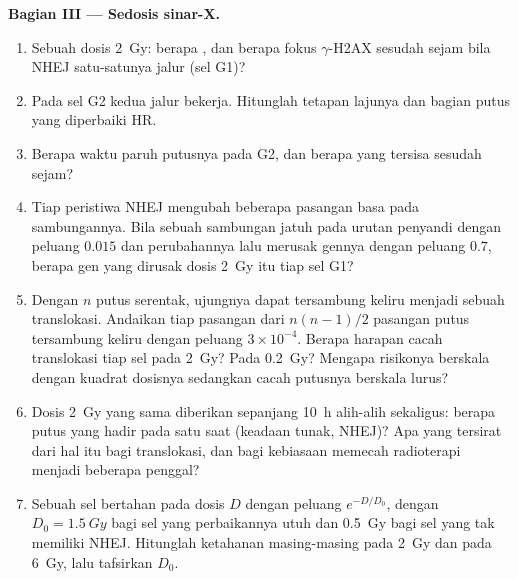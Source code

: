 \begin{problem}
\medskip
\noindent\textbf{Bagian III --- Sedosis sinar-X.}
\begin{enumerate}[resume]
  \item Sebuah dosis \qty{2}{Gy}: berapa , dan berapa
        fokus $\gamma$-H2AX sesudah sejam bila NHEJ satu-satunya jalur
        (sel G1)?
  \item Pada sel G2 kedua jalur bekerja. Hitunglah tetapan lajunya
        dan bagian putus yang diperbaiki HR.
  \item Berapa waktu paruh putusnya pada G2, dan berapa yang tersisa
        sesudah sejam?
  \item Tiap peristiwa NHEJ mengubah beberapa pasangan basa pada
        sambungannya. Bila sebuah sambungan jatuh pada urutan penyandi
        dengan peluang $0.015$ dan perubahannya lalu merusak gennya dengan
        peluang $0.7$, berapa gen yang dirusak dosis \qty{2}{Gy} itu tiap
        sel G1?
  \item Dengan $n$ putus serentak, ujungnya dapat tersambung keliru
        menjadi sebuah translokasi. Andaikan tiap pasangan dari $n(n-1)/2$
        pasangan putus tersambung keliru dengan peluang $3\times 10^{-4}$.
        Berapa harapan cacah translokasi tiap sel pada \qty{2}{Gy}? Pada
        \qty{0.2}{Gy}? Mengapa risikonya berskala dengan kuadrat dosisnya
        sedangkan cacah putusnya berskala lurus?
  \item Dosis \qty{2}{Gy} yang sama diberikan sepanjang \qty{10}{h}
        alih-alih sekaligus: berapa putus yang hadir pada satu saat
        (keadaan tunak, NHEJ)? Apa yang tersirat dari hal itu bagi
        translokasi, dan bagi kebiasaan memecah radioterapi menjadi
        beberapa penggal?
  \item Sebuah sel bertahan pada dosis $D$ dengan peluang $e^{-D/D_{0}}$,
        dengan $D_{0} = \qty{1.5}{Gy}$ bagi sel yang perbaikannya utuh dan
        \qty{0.5}{Gy} bagi sel yang tak memiliki NHEJ. Hitunglah ketahanan
        masing-masing pada \qty{2}{Gy} dan pada \qty{6}{Gy}, lalu tafsirkan
        $D_{0}$.
\end{enumerate}


\end{problem}
